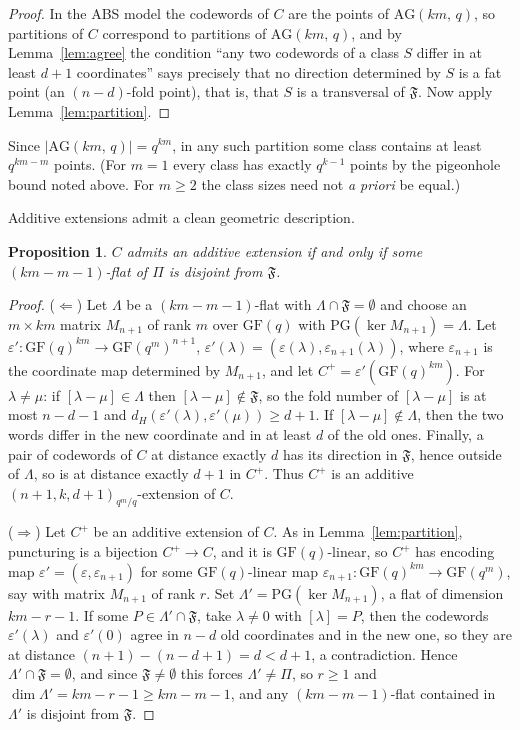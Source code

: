 \documentclass[12pt]{article}
\newtheorem{prop}[thm]{Proposition}
\theoremstyle{definition}
\numberwithin{equation}{section}
\newcommand{\la}{\lambda}
\newcommand{\GF}[1]{\mathrm{GF}(#1)}
\newcommand{\PGv}[1]{\mathrm{PG}(#1)}
\newcommand{\AG}[2]{\mathrm{AG}(#1,\,#2)}
\newcommand{\Afold}{\mathfrak{F}}
\begin{document}
\begin{proof}
In the ABS model the codewords of $C$ are the points of $\AG{km}{q}$, so partitions of $C$ correspond to partitions of $\AG{km}{q}$, and by Lemma~\ref{lem:agree} the condition ``any two codewords of a class $S$ differ in at least $d+1$ coordinates'' says precisely that no direction determined by $S$ is a fat point (an $(n-d)$-fold point), that is, that $S$ is a transversal of $\Afold$.  Now apply Lemma~\ref{lem:partition}.
\end{proof}

Since $|\AG{km}{q}|=q^{km}$, in any such partition some class contains at least $q^{km-m}$ points.  (For $m=1$ every class has exactly $q^{k-1}$ points by the pigeonhole bound noted above.  For $m\geq2$ the class sizes need not \textit{a priori} be equal.)


Additive extensions admit a clean geometric description.

\begin{prop}\label{prop:addext}
$C$ admits an additive extension if and only if some $(km-m-1)$-flat of $\Pi$ is disjoint from $\Afold$.
\end{prop}

\begin{proof}
($\Leftarrow$)  Let $\Lambda$ be a $(km-m-1)$-flat with $\Lambda\cap\Afold=\emptyset$ and choose an $m\times km$ matrix $M_{n+1}$ of rank $m$ over $\GF{q}$ with $\PGv{\ker M_{n+1}}=\Lambda$.  Let $\varepsilon':\GF{q}^{km}\to\GF{q^m}^{n+1}$, $\varepsilon'(\la)=(\varepsilon(\la),\varepsilon_{n+1}(\la))$, where $\varepsilon_{n+1}$ is the coordinate map determined by $M_{n+1}$, and let $C^+=\varepsilon'(\GF{q}^{km})$.  For $\la\neq\mu$: if $[\la-\mu]\in \Lambda$ then $[\la-\mu]\notin\Afold$, so the fold number of $[\la-\mu]$ is at most $n-d-1$ and $d_H(\varepsilon'(\la),\varepsilon'(\mu))\geq d+1$. If $[\la-\mu]\notin \Lambda$, then the two words differ in the new coordinate and in at least $d$ of the old ones.  Finally, a pair of codewords of $C$ at distance exactly $d$ has its direction in $\Afold$, hence outside of $\Lambda$, so is at distance exactly $d+1$ in $C^+$.  Thus $C^+$ is an additive $(n+1,k,d+1)_{q^m/q}$-extension of $C$.

($\Rightarrow$)  Let $C^+$ be an additive extension of $C$. As in Lemma~\ref{lem:partition}, puncturing is a bijection $C^+\to C$, and it is $\GF{q}$-linear, so $C^+$ has encoding map $\varepsilon'=(\varepsilon,\varepsilon_{n+1})$ for some $\GF{q}$-linear map $\varepsilon_{n+1}:\GF{q}^{km}\to\GF{q^m}$, say with matrix $M_{n+1}$ of rank $r$.  Set $\Lambda'=\PGv{\ker M_{n+1}}$, a flat of dimension $km-r-1$. If some $P\in \Lambda'\cap\Afold$, take $\la\ne 0$ with $[\la]=P$, then the codewords $\varepsilon'(\la)$ and $\varepsilon'(0)$ agree in $n-d$ old coordinates and in the new one, so they are at distance $(n+1)-(n-d+1)=d<d+1$, a contradiction.  Hence $\Lambda'\cap\Afold=\emptyset$, and since $\Afold\neq\emptyset$ this forces $\Lambda'\neq\Pi$, so $r\geq1$ and $\dim \Lambda'=km-r-1\geq km-m-1$, and any $(km-m-1)$-flat contained in $\Lambda'$ is disjoint from $\Afold$.
\end{proof}
\end{document}
